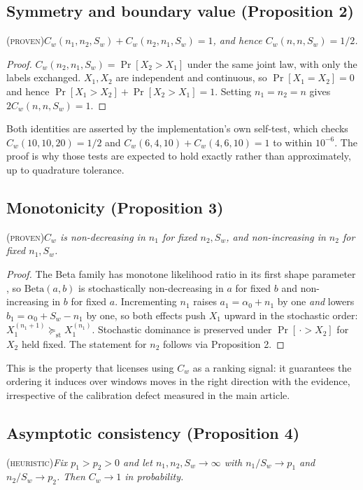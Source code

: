 \documentclass[preprint,11pt]{elsarticle}
\newcommand{\PROVEN}{\textsc{(proven)}}
\newcommand{\HEUR}{\textsc{(heuristic)}}
\newcommand{\Cw}{C_w}
\begin{document}
\subsection{Symmetry and boundary value (Proposition 2)}
\PROVEN{}\quad\textit{$\Cw(n_1,n_2,S_w)+\Cw(n_2,n_1,S_w)=1$, and hence
$\Cw(n,n,S_w)=1/2$.}

\begin{proof}
$\Cw(n_2,n_1,S_w)=\Pr[X_2>X_1]$ under the same joint law, with only the
labels exchanged. $X_1,X_2$ are independent and continuous, so
$\Pr[X_1=X_2]=0$ and hence $\Pr[X_1>X_2]+\Pr[X_2>X_1]=1$. Setting
$n_1=n_2=n$ gives $2\Cw(n,n,S_w)=1$.
\end{proof}

\noindent
Both identities are asserted by the implementation's own self-test, which
checks $\Cw(10,10,20)=1/2$ and $\Cw(6,4,10)+\Cw(4,6,10)=1$ to within
$10^{-6}$. The proof is why those tests are expected to hold exactly
rather than approximately, up to quadrature tolerance.

\subsection{Monotonicity (Proposition 3)}
\PROVEN{}\quad\textit{$\Cw$ is non-decreasing in $n_1$ for fixed
$n_2,S_w$, and non-increasing in $n_2$ for fixed $n_1,S_w$.}

\begin{proof}
The Beta family has monotone likelihood ratio in its first shape
parameter \cite[Ch.~3]{lehmannromano2005}, so $\mathrm{Beta}(a,b)$ is
stochastically non-decreasing in $a$ for fixed $b$ and non-increasing in
$b$ for fixed $a$. Incrementing $n_1$ raises $a_1=\alpha_0+n_1$ by one
\emph{and} lowers $b_1=\alpha_0+S_w-n_1$ by one, so both effects push
$X_1$ upward in the stochastic order:
$X_1^{(n_1+1)}\succeq_{\mathrm{st}}X_1^{(n_1)}$. Stochastic dominance is
preserved under $\Pr[\,\cdot>X_2]$ for $X_2$ held fixed. The statement
for $n_2$ follows via Proposition 2.
\end{proof}

\noindent
This is the property that licenses using $\Cw$ as a ranking signal: it
guarantees the ordering it induces over windows moves in the right
direction with the evidence, irrespective of the calibration defect
measured in the main article.

\subsection{Asymptotic consistency (Proposition 4)}
\HEUR{}\quad\textit{Fix $p_1>p_2>0$ and let $n_1,n_2,S_w\to\infty$ with
$n_1/S_w\to p_1$ and $n_2/S_w\to p_2$. Then $\Cw\to1$ in probability.}
\end{document}
